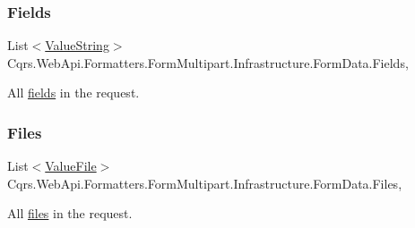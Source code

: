 \subsubsection{\texorpdfstring{Fields}{Fields}}
{\footnotesize\ttfamily List$<$\hyperlink{classCqrs_1_1WebApi_1_1Formatters_1_1FormMultipart_1_1Infrastructure_1_1FormData_1_1ValueString}{Value\+String}$>$ Cqrs.\+Web\+Api.\+Formatters.\+Form\+Multipart.\+Infrastructure.\+Form\+Data.\+Fields\hspace{0.3cm}{\ttfamily [get]}, {\ttfamily [set]}}



All \hyperlink{classCqrs_1_1WebApi_1_1Formatters_1_1FormMultipart_1_1Infrastructure_1_1FormData_1_1ValueString}{fields} in the request. 

\mbox{\label{classCqrs_1_1WebApi_1_1Formatters_1_1FormMultipart_1_1Infrastructure_1_1FormData_a09da7b76f703fc20899051d9d9ed17b0_a09da7b76f703fc20899051d9d9ed17b0}} 
\subsubsection{\texorpdfstring{Files}{Files}}
{\footnotesize\ttfamily List$<$\hyperlink{classCqrs_1_1WebApi_1_1Formatters_1_1FormMultipart_1_1Infrastructure_1_1FormData_1_1ValueFile}{Value\+File}$>$ Cqrs.\+Web\+Api.\+Formatters.\+Form\+Multipart.\+Infrastructure.\+Form\+Data.\+Files\hspace{0.3cm}{\ttfamily [get]}, {\ttfamily [set]}}



All \hyperlink{classCqrs_1_1WebApi_1_1Formatters_1_1FormMultipart_1_1Infrastructure_1_1FormData_1_1ValueFile}{files} in the request. 

